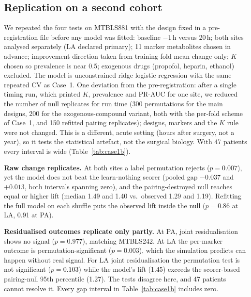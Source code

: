 \documentclass[conference]{IEEEtran}
\newcommand{\verified}[1]{#1}  %
\begin{document}
\subsection{Replication on a second cohort}
We repeated the four tests on MTBLS881 with the design fixed in a
pre-registration file before any model was fitted: baseline $-1$\,h versus
20\,h; both sites analysed separately (LA declared primary); 11 marker
metabolites chosen in advance; improvement direction taken from training-fold
mean change only; $K$ chosen so prevalence is near 0.5; exogenous drugs
(propofol, heparin, ethanol) excluded. The model is unconstrained ridge
logistic regression with the same repeated CV as Case~1. One deviation from
the pre-registration: after a single timing run, which printed $K$,
prevalence and PR-AUC for one site, we reduced the number of null replicates
for run time (300 permutations for the main designs, 200 for the
exogenous-compound variant, both with the per-fold scheme of Case~1, and 150
refitted pairing replicates); designs,
markers and the $K$ rule were not changed. This is a different, acute setting
(hours after surgery, not a year), so it tests the statistical artefact, not
the surgical biology. With 47 patients every interval is wide
(Table~\ref{tab:case1b}).

\textbf{Raw change replicates.} At both sites a label permutation rejects
($p=\verified{0.007}$), yet the model does not beat the learn-nothing scorer
(pooled gap \verified{$-0.037$} and \verified{$+0.013$}, both intervals
spanning zero), and the pairing-destroyed null reaches equal or higher lift
(median \verified{1.49} and \verified{1.40} vs.\ observed \verified{1.29} and
\verified{1.19}). Refitting the full model on each shuffle puts the observed
lift inside the null ($p=\verified{0.86}$ at LA, \verified{0.91} at PA).

\textbf{Residualised outcomes replicate only partly.} At PA, joint
residualisation shows no signal ($p=\verified{0.977}$), matching MTBLS242. At
LA the per-marker outcome is permutation-significant ($p=\verified{0.003}$),
which the simulation predicts can happen without real signal. For LA joint
residualisation the permutation test is not significant
($p=\verified{0.103}$) while the model's lift (\verified{1.45}) exceeds the
scorer-based pairing-null 95th percentile (\verified{1.27}). The tests
disagree here, and 47 patients cannot resolve it. Every gap interval in
Table~\ref{tab:case1b} includes zero.
\end{document}
